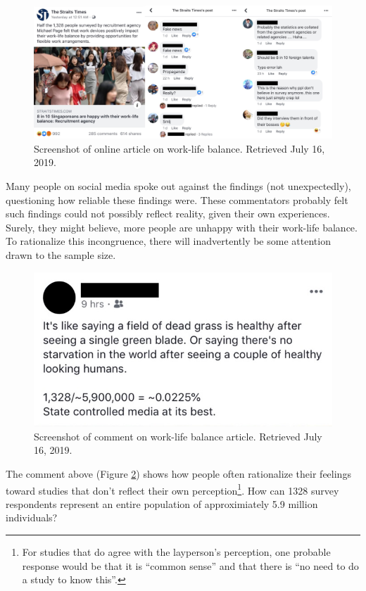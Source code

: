 \documentclass[openany]{book}
\let\rmarkdownfootnote\footnote%
\def\footnote{\protect\rmarkdownfootnote}
\begin{document}
\begin{figure}

{\centering \includegraphics[width=0.9\linewidth]{images/samples/st_worklife} 

}

\caption{Screenshot of online article on work-life balance. Retrieved July 16, 2019.}\label{fig:st-worklife}
\end{figure}

Many people on social media spoke out against the findings (not
unexpectedly), questioning how reliable these findings were. These
commentators probably felt such findings could not possibly reflect
reality, given their own experiences. Surely, they might believe, more
people are unhappy with their work-life balance. To rationalize this
incongruence, there will inadvertently be some attention drawn to the
sample size.

\begin{figure}

{\centering \includegraphics[width=0.6\linewidth]{images/samples/st_samplesize} 

}

\caption{Screenshot of comment on work-life balance article. Retrieved July 16, 2019.}\label{fig:st-samplesize}
\end{figure}

The comment above (Figure \ref{fig:st-samplesize}) shows how people
often rationalize their feelings toward studies that don't reflect their
own perception\footnote{For studies that do agree with the layperson's
  perception, one probable response would be that it is ``common sense''
  and that there is ``no need to do a study to know this''.}. How can
1328 survey respondents represent an entire population of approximiately
5.9 million individuals?
\end{document}
